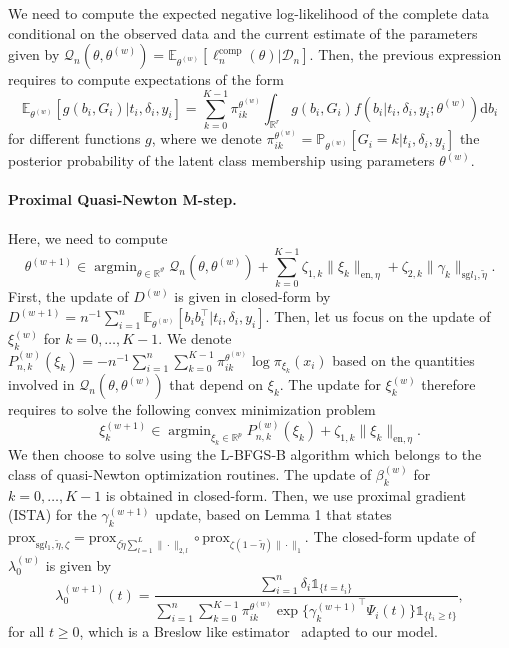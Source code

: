 \documentclass[11pt]{article}
\DeclareMathOperator{\argmin}{argmin}
\newcommand{\dd}{\mathrm{d}}
\newcommand{\ind}[1]{\mathds{1}_{#1}}
\newcommand{\norm}[1]{\|#1\|}
\newcommand{\cD}{\mathcal D}
\newcommand{\cQ}{\mathcal Q}
\newcommand{\R}{\mathds R}
\newcommand{\E}{\mathds E}
\renewcommand{\P}{\mathds P}
\begin{document}
We need to compute the expected negative log-likelihood of the complete data conditional on the observed data and the current estimate of the parameters given by $\cQ_n(\theta, \theta^{(w)}) = \E_{\theta^{(w)}}[\ell_n^\text{comp}(\theta) | \cD_n]$.
Then, the previous expression requires to compute expectations of the form
\[ \E_{\theta^{(w)}}[ g(b_i, G_i) | t_i, \delta_i, y_i] = \sum_{k=0}^{K-1} \pi_{ik}^{\theta^{(w)}} \int_{\R^r} g(b_i, G_i) f(b_i | t_i, \delta_i, y_i ; \theta^{(w)}) \dd b_i \]
for different functions $g$, where we denote $\pi_{ik}^{\theta^{(w)}} = \P_{\theta^{(w)}}[G_i = k | t_i, \delta_i, y_i]$ the posterior probability of the latent class membership using parameters $\theta^{(w)}$.

\paragraph*{Proximal Quasi-Newton M-step.}
Here, we need to compute \[\theta^{(w+1)} \in \argmin_{\theta \in \R^\vartheta} \cQ_n(\theta, \theta^{(w)}) + \sum_{k=0}^{K-1} \zeta_{1,k} \norm{\xi_k}_{\text{en}, \eta} + \zeta_{2,k} \norm{\gamma_k}_{\text{sg} l_1, \tilde{\eta}}.\]
First, the update of $D^{(w)}$ is given in closed-form by $D^{(w+1)} = n^{-1} \sum_{i=1}^n \E_{\theta^{(w)}}[ b_i b_i^\top | t_i, \delta_i, y_i]$.
Then, let us focus on the update of $\xi_k^{(w)}$ for $k=0, \ldots, K-1$. We denote $P^{(w)}_{n, k}(\xi_k) = -n^{-1} \sum_{i=1}^n \sum_{k=0}^{K-1} \pi_{ik}^{\theta^{(w)}} \log \pi_{\xi_k}(x_i)$ based on the quantities involved in $\cQ_n(\theta, \theta^{(w)})$ that depend on $\xi_k$. The update for $\xi_k^{(w)}$ therefore requires to solve the following convex minimization problem
\begin{equation*}
  \xi_k^{(w+1)} \in \argmin_{\xi_k \in \R^p} P^{(w)}_{n,k}(\xi_k) + \zeta_{1,k} \norm{\xi_k}_{\text{en}, \eta}.
\end{equation*}
We then choose to solve using the L-BFGS-B algorithm  which belongs to the class of quasi-Newton optimization routines.
The update of $\beta_k^{(w)}$ for $k=0, \ldots, K-1$ is obtained in closed-form. Then, we use proximal gradient (ISTA) for the $\gamma_k^{(w+1)}$ update, based on Lemma 1 that states $\text{prox}_{\text{sg} l_1,\tilde \eta, \zeta} = \text{prox}_{\zeta \tilde \eta \sum_{l=1}^L \norm{\cdot}_{2,l}} \circ \text{prox}_{\zeta (1 - \tilde \eta) \norm{\cdot}_1}$. 
The closed-form update of $\lambda_0^{(w)}$ is given by
\begin{equation*}
  \lambda_0^{(w+1)}(t)= \dfrac{\sum_{i=1}^n \delta_i \ind{\{t=t_i\}}}{\sum_{i=1}^n \sum_{k=0}^{K-1} \pi_{ik}^{\theta^{(w)}} \exp \big\{{\gamma_k^{(w+1)}}^\top \Psi_i(t)\big\} \ind{\{t_i \geq t\}} },
\end{equation*}
for all $t \geq 0$, which is a Breslow like estimator~\citep{breslow1972contribution} adapted to our model. 
\end{document}
